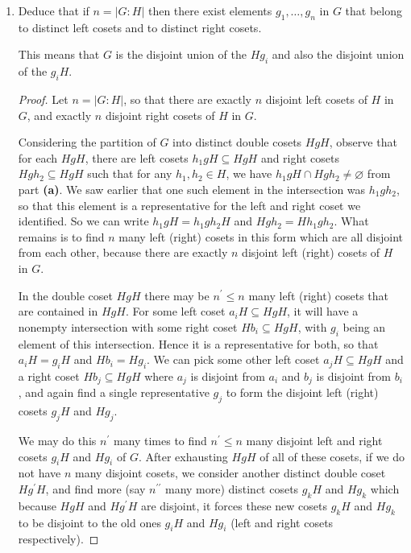 \documentclass[11pt]{article}
\newcommand{\dprime}{\prime\prime}
\begin{document}
\begin{enumerate}
\begin{enumerate}[label=\textbf{(\alph*)}]
\begin{proof}
            Because $xH$ and $Hy$ were arbitrary cosets contained in $HgH$, it follows that every left coset contained in a given double coset has nonempty intersection with every right coset contained in the same double coset.
        \end{proof}
        \item Deduce that if $n=|G:H|$ then there exist elements $g_1,\dots, g_n$ in $G$ that belong to distinct left cosets and to distinct right cosets.
    
        This means that $G$ is the disjoint union of the $Hg_i$ and also the disjoint union of the $g_iH$.
        \begin{proof}
            Let $n=|G:H|$, so that there are exactly $n$ disjoint left cosets of $H$ in $G$, and exactly $n$ disjoint right cosets of $H$ in $G$.
            
            Considering the partition of $G$ into distinct double cosets $HgH$, observe that for each $HgH$, there are left cosets $h_1gH\subseteq HgH$ and right cosets $Hgh_2\subseteq HgH$ such that for any $h_1,h_2\in H$, we have $h_1gH\cap Hgh_2\neq \varnothing$ from part \textbf{(a)}. We saw earlier that one such element in the intersection was $h_1gh_2$, so that this element is a representative for the left and right coset we identified. So we can write $h_1gH = h_1gh_2H$ and $Hgh_2 = Hh_1gh_2$. What remains is to find $n$ many left (right) cosets in this form which are all disjoint from each other, because there are exactly $n$ disjoint left (right) cosets of $H$ in $G$.

            In the double coset $HgH$ there may be $n^{\prime}\leq n$ many left (right) cosets that are contained in $HgH$. For some left coset $a_iH\subseteq HgH$, it will have a nonempty intersection with some right coset $Hb_i\subseteq HgH$, with $g_i$ being an element of this intersection. Hence it is a representative for both, so that $a_iH = g_iH$ and $Hb_i = Hg_i$. We can pick some other left coset $a_j H\subseteq HgH$ and a right coset $Hb_j \subseteq HgH$ where $a_j$ is disjoint from $a_i$ and $b_j$ is disjoint from $b_i$, and again find a single representative $g_j$ to form the disjoint left (right) cosets $g_jH$ and $Hg_j$.
            
            We may do this $n^{\prime}$ many times to find $n^{\prime}\leq n$ many disjoint left and right cosets $g_iH$ and $Hg_i$ of $G$. After exhausting $HgH$ of all of these cosets, if we do not have $n$ many disjoint cosets, we consider another distinct double coset $Hg^{\prime}H$, and find more (say $n^{\dprime}$ many more) distinct cosets $g_kH$ and $Hg_k$ which because $HgH$ and $Hg^{\prime}H$ are disjoint, it forces these new cosets $g_kH$ and $Hg_k$ to be disjoint to the old ones $g_iH$ and $Hg_i$ (left and right cosets respectively).


\end{proof}
\end{enumerate}
\end{enumerate}
\end{document}
